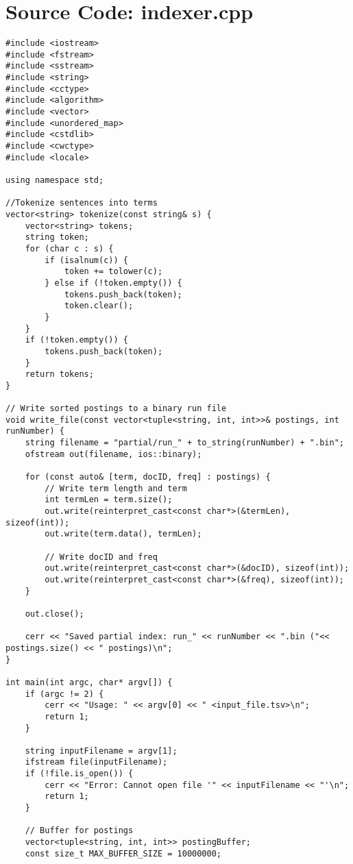 \documentclass{article}
\begin{document}
\newpage
\appendix
\section{Source Code: indexer.cpp}
\begin{lstlisting}[caption={The complete source code for the indexer component.}, label={lst:indexer}]
#include <iostream>
#include <fstream>
#include <sstream>
#include <string>
#include <cctype>
#include <algorithm>
#include <vector>
#include <unordered_map>
#include <cstdlib>
#include <cwctype>
#include <locale>

using namespace std;

//Tokenize sentences into terms
vector<string> tokenize(const string& s) {
    vector<string> tokens;
    string token;
    for (char c : s) {
        if (isalnum(c)) {
            token += tolower(c);
        } else if (!token.empty()) {
            tokens.push_back(token);
            token.clear();
        }
    }
    if (!token.empty()) {
        tokens.push_back(token);
    }
    return tokens;
}

// Write sorted postings to a binary run file
void write_file(const vector<tuple<string, int, int>>& postings, int runNumber) {
    string filename = "partial/run_" + to_string(runNumber) + ".bin";
    ofstream out(filename, ios::binary);
    
    for (const auto& [term, docID, freq] : postings) {
        // Write term length and term
        int termLen = term.size();
        out.write(reinterpret_cast<const char*>(&termLen), sizeof(int));
        out.write(term.data(), termLen);
        
        // Write docID and freq
        out.write(reinterpret_cast<const char*>(&docID), sizeof(int));
        out.write(reinterpret_cast<const char*>(&freq), sizeof(int));
    }
    
    out.close();
    
    cerr << "Saved partial index: run_" << runNumber << ".bin ("<< postings.size() << " postings)\n";
}

int main(int argc, char* argv[]) {
    if (argc != 2) {
        cerr << "Usage: " << argv[0] << " <input_file.tsv>\n";
        return 1;
    }

    string inputFilename = argv[1];
    ifstream file(inputFilename);
    if (!file.is_open()) {
        cerr << "Error: Cannot open file '" << inputFilename << "'\n";
        return 1;
    }

    // Buffer for postings
    vector<tuple<string, int, int>> postingBuffer;
    const size_t MAX_BUFFER_SIZE = 10000000;
    

\end{lstlisting}
\end{document}

